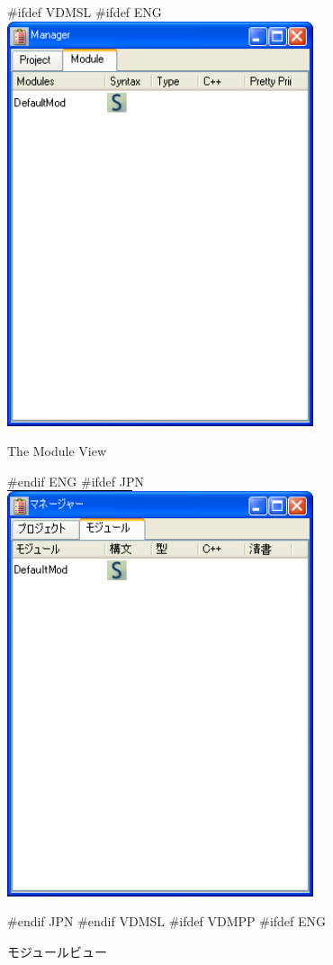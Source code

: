 \documentclass[\pformat,12pt]{article}
\begin{document}
\begin{figure}[tbh]
\begin{center}
#ifdef VDMSL
#ifdef ENG
\includegraphics[width=9cm]{moduleViewENG.png}
\caption{The Module View}
#endif ENG
#ifdef JPN
\includegraphics[width=9cm]{moduleView.png}
\caption{モジュールビュー}
#endif JPN
#endif VDMSL
#ifdef VDMPP
#ifdef ENG

\end{center}
\end{figure}
\end{document}
